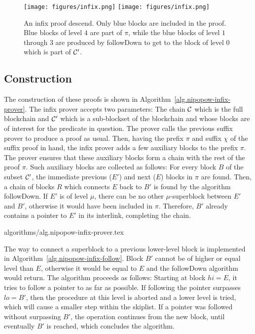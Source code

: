 \begin{figure}[h]
    \caption{An infix proof descend. Only blue blocks are included in the proof.
    Blue blocks of level $4$ are part of $\pi$, while the blue blocks of level
    $1$ through $3$ are produced by followDown to get to the block of level $0$
    which is part of $\mathcal{C}'$.}
    \centering
    \iftwocolumn
        \texttt{[image: figures/infix.png]}
    \else
        \texttt{[image: figures/infix.png]}
    \fi
    \label{fig.infix}
\end{figure}

\subsection{Construction}

The construction of these proofs is shown in
Algorithm~\ref{alg.nipopow-infix-prover}. The infix prover accepts two
parameters: The chain $\mathcal{C}$ which is the full blockchain and $\mathcal{C}'$ which
is a sub-blockset of the blockchain and whose blocks are of interest for the
predicate in question. The prover calls the previous suffix prover to produce a
proof as usual. Then, having the prefix $\pi$ and suffix $\chi$ of the suffix
proof in hand, the infix prover adds a few auxiliary blocks to the prefix $\pi$.
The prover ensures that these auxiliary blocks form a chain with the rest of the
proof $\pi$. Such auxiliary blocks are collected as follows: For every block $B$
of the subset $\mathcal{C}'$, the immediate previous ($E'$) and next ($E$) blocks
in $\pi$ are found. Then, a chain of blocks $R$ which connects $E$ back to $B'$
is found by the algorithm followDown. If $E'$ is of level $\mu$, there can be no
other $\mu$-superblock between $E'$ and $B'$, otherwise it would have been
included in $\pi$. Therefore, $B'$ already contains a pointer to $E'$ in its
interlink, completing the chain.

{algorithms/alg.nipopow-infix-prover.tex}

The way to connect a superblock to a previous lower-level block is implemented
in Algorithm~\ref{alg.nipopow-infix-follow}.  Block $B'$ cannot be of higher or
equal level than $E$, otherwise it would be equal to $E$ and the followDown
algorithm would return. The algorithm proceeds as follows: Starting at block $hi =
E$, it tries to follow a pointer to as far as possible. If following the pointer
surpasses $lo = B'$, then the procedure at this level is aborted and a lower
level is tried, which will cause a smaller step within the skiplist. If a
pointer was followed without surpassing $B'$, the operation continues from the
new block, until eventually $B'$ is reached, which concludes the algorithm.

